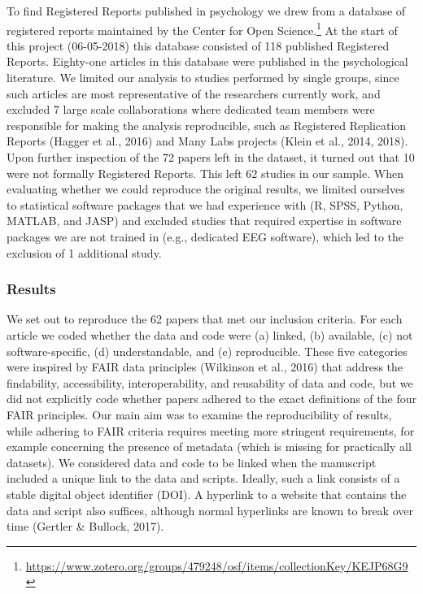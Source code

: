 \documentclass[,jou, a4paper,floatsintext]{apa6}
\let\rmarkdownfootnote\footnote%
\def\footnote{\protect\rmarkdownfootnote}
\begin{document}
To find Registered Reports published in psychology we drew from a database of registered reports maintained by the Center for Open Science.\footnote{\url{https://www.zotero.org/groups/479248/osf/items/collectionKey/KEJP68G9}} At the start of this project (06-05-2018) this database consisted of 118 published Registered Reports. Eighty-one articles in this database were published in the psychological literature. We limited our analysis to studies performed by single groups, since such articles are most representative of the researchers currently work, and excluded 7 large scale collaborations where dedicated team members were responsible for making the analysis reproducible, such as Registered Replication Reports (Hagger et al., 2016) and Many Labs projects (Klein et al., 2014, 2018). Upon further inspection of the 72 papers left in the dataset, it turned out that 10 were not formally Registered Reports. This left 62 studies in our sample. When evaluating whether we could reproduce the original results, we limited ourselves to statistical software packages that we had experience with (R, SPSS, Python, MATLAB, and JASP) and excluded studies that required expertise in software packages we are not trained in (e.g., dedicated EEG software), which led to the exclusion of 1 additional study.

\hypertarget{results}{%
\subsubsection{Results}\label{results}}

We set out to reproduce the 62 papers that met our inclusion criteria. For each article we coded whether the data and code were (a) linked, (b) available, (c) not software-specific, (d) understandable, and (e) reproducible. These five categories were inspired by FAIR data principles (Wilkinson et al., 2016) that address the findability, accessibility, interoperability, and reusability of data and code, but we did not explicitly code whether papers adhered to the exact definitions of the four FAIR principles. Our main aim was to examine the reproducibility of results, while adhering to FAIR criteria requires meeting more stringent requirements, for example concerning the presence of metadata (which is missing for practically all datasets). We considered data and code to be linked when the manuscript included a unique link to the data and scripts. Ideally, such a link consists of a stable digital object identifier (DOI). A hyperlink to a website that contains the data and script also suffices, although normal hyperlinks are known to break over time (Gertler \& Bullock, 2017).
\end{document}
